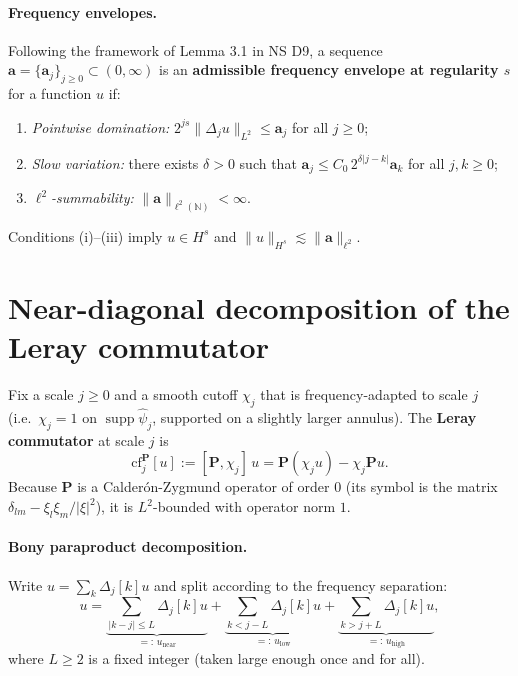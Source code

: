 \documentclass[11pt]{article}
\theoremstyle{definition}
\newcommand{\PP}{\mathbf{P}}          %
\newcommand{\Dj}{\Delta_j}            %
\newcommand{\Lp}[1]{L^{#1}}
\newcommand{\Hs}[1]{H^{#1}}
\newcommand{\norm}[1]{\lVert #1 \rVert}
\newcommand{\abs}[1]{\lvert #1 \rvert}
\newcommand{\N}{\mathbb{N}}
\newcommand{\supp}{\operatorname{supp}}
\newcommand{\cf}{\mathrm{cf}}         %
\newcommand{\env}{\mathbf{a}}         %
\begin{document}
\paragraph{Frequency envelopes.}
Following the framework of Lemma 3.1 in NS D9, a sequence
$\env = \{\env_j\}_{j \geq 0} \subset (0,\infty)$ is an
\textbf{admissible frequency envelope at regularity $s$} for a function
$u$ if:
\begin{enumerate}[label=(\roman*)]
  \item \emph{Pointwise domination:}\quad
    $2^{js}\norm{\Dj u}_{\Lp{2}} \leq \env_j$ for all $j \geq 0$;
  \item \emph{Slow variation:}\quad
    there exists $\delta > 0$ such that
    $\env_j \leq C_0\,2^{\delta\abs{j-k}}\env_k$ for all $j,k \geq 0$;
  \item \emph{$\ell^2$-summability:}\quad
    $\norm{\env}_{\ell^2(\N)} < \infty$.
\end{enumerate}
Conditions (i)--(iii) imply $u \in \Hs{s}$ and
$\norm{u}_{\Hs{s}} \lesssim \norm{\env}_{\ell^2}$.

\section{Near-diagonal decomposition of the Leray commutator}
\label{sec:leray-commutator}

Fix a scale $j \geq 0$ and a smooth cutoff $\chi_j$ that is frequency-adapted
to scale $j$ (i.e.\ $\chi_j = 1$ on $\supp\hat\psi_j$, supported on a slightly
larger annulus).  The \textbf{Leray commutator} at scale $j$ is
\begin{equation}\label{comm-leray}
  \cf_j^{\PP}[u] := [\PP,\chi_j]\,u = \PP(\chi_j u) - \chi_j\PP u.
\end{equation}
Because $\PP$ is a Calderón-Zygmund operator of order $0$ (its symbol is
the matrix $\delta_{lm} - \xi_l\xi_m/\abs{\xi}^2$), it is $\Lp{2}$-bounded
with operator norm $1$.

\paragraph{Bony paraproduct decomposition.}
Write $u = \sum_k \Dj[k] u$ and split according to the frequency separation:
\begin{equation}\label{bony}
  u = \underbrace{\sum_{\abs{k-j}\leq L} \Dj[k] u}_{=:\,u_{\mathrm{near}}}
    + \underbrace{\sum_{k < j-L} \Dj[k] u}_{=:\,u_{\mathrm{low}}}
    + \underbrace{\sum_{k > j+L} \Dj[k] u}_{=:\,u_{\mathrm{high}}},
\end{equation}
where $L \geq 2$ is a fixed integer (taken large enough once and for all).
\end{document}
